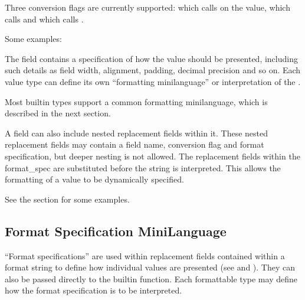\documentclass[letterpaper,10pt,english]{sphinxmanual}
\begin{document}
Three conversion flags are currently supported:  which calls 
on the value,  which calls  and  which calls
.

Some examples:

\begin{sphinxVerbatim}[commandchars=\\\{\}]
        
    
                      
\end{sphinxVerbatim}

The  field contains a specification of how the value should be
presented, including such details as field width, alignment, padding, decimal
precision and so on.  Each value type can define its own “formatting
mini\sphinxhyphen{}language” or interpretation of the .

Most built\sphinxhyphen{}in types support a common formatting mini\sphinxhyphen{}language, which is
described in the next section.

A  field can also include nested replacement fields within it.
These nested replacement fields may contain a field name, conversion flag
and format specification, but deeper nesting is
not allowed.  The replacement fields within the
format\_spec are substituted before the  string is interpreted.
This allows the formatting of a value to be dynamically specified.

See the {\hyperref[\detokenize{string:formatexamples}]{}} section for some examples.


\subsection{Format Specification Mini\sphinxhyphen{}Language}
\label{\detokenize{string:format-specification-mini-language}}\label{\detokenize{string:formatspec}}
“Format specifications” are used within replacement fields contained within a
format string to define how individual values are presented (see
{\hyperref[\detokenize{string:formatstrings}]{}} and ).
They can also be passed directly to the built\sphinxhyphen{}in
 function.  Each formattable type may define how the format
specification is to be interpreted.
\end{document}
